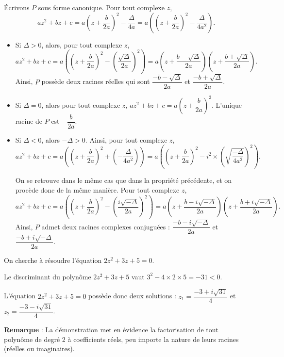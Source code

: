 \documentclass[11pt,fleqn, openany]{book} %
\begin{document}
\begin{demonstration}
Écrivons $P$ sous forme canonique. Pour tout complexe $z$,
\[az^2+bz+c = a\left(z+\dfrac{b}{2a}\right)^2- \dfrac{\Delta}{4a} = a\left(\left(z+\dfrac{b}{2a}\right)^2- \dfrac{\Delta}{4a^2}\right).\]

\begin{itemize}
\item Si $\Delta > 0$, alors, pour tout complexe $z$, 
\[az^2+bz+c = a\left(\left(z+\dfrac{b}{2a}\right)^2- \left(\dfrac{\sqrt{\Delta}}{2a}\right)^2\right) = a\left(z+\dfrac{b-\sqrt{\Delta}}{2a}\right)\left(z+\dfrac{b+\sqrt{\Delta}}{2a}\right).\]
Ainsi, $P$ possède deux racines réelles qui sont $\dfrac{-b-\sqrt{\Delta}}{2a}$ et $\dfrac{-b+\sqrt{\Delta}}{2a}$.
\item Si $\Delta =0$, alors pour tout complexe $z$, $az^2+bz+c = a\left(z+\dfrac{b}{2a}\right)^2$. L'unique racine de $P$ est $-\dfrac{b}{2a}$.
\item Si $\Delta <0$, alors $-\Delta >0$. Ainsi, pour tout complexe $z$,
\[az^2+bz+c = a\left(\left(z+\dfrac{b}{2a}\right)^2+ \left(- \dfrac{\Delta}{4a^2}\right)\right)= a\left(\left(z+\dfrac{b}{2a}\right)^2- i^2 \times \left(\sqrt{\dfrac{-\Delta}{4a^2}}\right)^2\right).\]

On se retrouve dans le même cas que dans la propriété précédente, et on procède donc de la même manière. Pour tout complexe $z$,
\[az^2+bz+c=a\left(\left(z+\dfrac{b}{2a}\right)^2-   \left(\dfrac{i\sqrt{-\Delta}}{2a}\right)^2\right) = a\left(z+\dfrac{b-i\sqrt{-\Delta}}{2a}\right)\left(z+\dfrac{b+i\sqrt{-\Delta}}{2a}\right).\]
Ainsi, $P$ admet deux racines complexes conjuguées : $\dfrac{-b-i\sqrt{-\Delta}}{2a}$ et $\dfrac{-b+i\sqrt{-\Delta}}{2a}$.
\end{itemize}
\end{demonstration}

\begin{example}
On cherche à résoudre l'équation $2z^2+3z+5=0$. 

Le discriminant du polynôme $2z^2+3z+5$ vaut $3^2-4\times 2  \times 5=-31<0$.

L'équation $2z^2+3z+5=0$ possède donc deux solutions : $z_1=\dfrac{-3+i\sqrt{31}}{4}$ et $z_2=\dfrac{-3-i\sqrt{31}}{4}$. 
\end{example}

\textbf{Remarque} : La démonstration met en évidence la factorisation de tout polynôme de degré 2 à coefficients réels, peu importe la nature de leurs racines (réelles ou imaginaires). 
\end{document}
